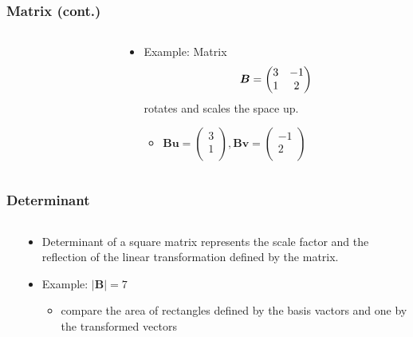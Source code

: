 \documentclass[pdflatex, 12pt]{beamer}
\begin{document}
\begin{frame}
\frametitle{Matrix (cont.)}
\begin{columns}
\begin{column}{0.5\textwidth}
\centering
{}
\end{column}
\begin{column}{0.5\textwidth}
\begin{itemize}
\item Example: Matrix 
 \begin{equation}
 \bm{B} = \begin{pmatrix}
 3 & -1 \\
 1 & 2 \\
 \end{pmatrix} \notag
 \end{equation}
rotates and scales the space up.
 \begin{itemize}
 \item $\bm{Bu} = \begin{pmatrix}
 3 \\
 1 \\
 \end{pmatrix}, \bm{Bv} = \begin{pmatrix}
 -1 \\
 2 \\
 \end{pmatrix}$
 \end{itemize}
\end{itemize}
\end{column}
\end{columns}
\end{frame}

\begin{frame}
\frametitle{Determinant}
\begin{columns}
\begin{column}{0.5\textwidth}
\centering
{}
\end{column}
\begin{column}{0.5\textwidth}
\begin{itemize}
\item Determinant of a square matrix represents the scale factor and the reflection of the linear transformation defined by the matrix.
\vspace{0.4cm}
\item Example: $|\bm{B}| = 7$
 \begin{itemize}
 \item compare the area of rectangles defined by the basis vactors and one by the transformed vectors
 \end{itemize}
\end{itemize}
\end{column}
\end{columns}
\end{frame}
\end{document}
